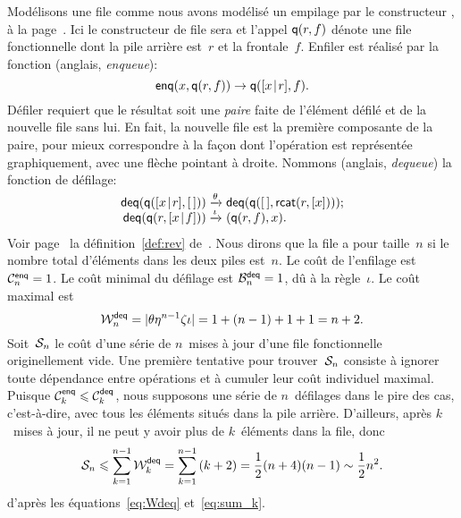 Modélisons une file comme nous avons modélisé un empilage par le
constructeur , à la
page~\pageref{par:stacks}. Ici le constructeur de file sera
 et l'appel \(\fun{q}(r,f)\) dénote une
file fonctionnelle dont la pile arrière est~\(r\) et la
frontale~\(f\). Enfiler est réalisé par la fonction
 (anglais, \emph{enqueue}):
\begin{equation}
\fun{enq}(x,\fun{q}(r,f)) \rightarrow \fun{q}(\cons{x}{r},f).
\label{def:enq}
\end{equation}
Défiler requiert que le résultat soit une \emph{paire} faite de l'élément défilé et de la nouvelle file
sans lui. En fait, la nouvelle file est la première composante de la
paire, pour mieux correspondre à la façon dont l'opération est
représentée graphiquement, avec une flèche pointant à droite.
Nommons  (anglais, \emph{dequeue})
la fonction de défilage:
\begin{equation}
\begin{array}{@{}r@{\;}l@{\;}l@{}}
  \fun{deq}(\fun{q}(\cons{x}{r},\el))
& \xrightarrow{\smash{\theta}}
& \fun{deq}(\fun{q}(\el,\fun{rcat}(r,[x])));\\
  \fun{deq}(\fun{q}(r,\cons{x}{f}))
& \xrightarrow{\smash{\iota}}
& \pair{\fun{q}(r,f)}{x}.
\end{array}
\label{def:deq}
\end{equation}
Voir page~\pageref{def:rev} la définition~\eqref{def:rev}
de~. Nous dirons que la file a
pour taille~\(n\) si le nombre total d'éléments dans les deux piles
est~\(n\).  Le coût de l'enfilage est
\(\C{\fun{enq}}{n} = 1\). Le coût
minimal du défilage est
\(\B{\fun{deq}}{n} = 1\), dû à la règle~\(\iota\). Le coût maximal est
\begin{equation}
  \W{\fun{deq}}{n} = \len{\theta\eta^{n-1}\zeta\iota} = 1 + (n-1)
+ 1 + 1 = n + 2. \label{eq:Wdeq}
\end{equation}
Soit~\(\A{n}\) le coût d'une série de \(n\)~mises à jour d'une file
fonctionnelle originellement vide. Une première tentative pour
trouver~\(\A{n}\) consiste à ignorer toute dépendance entre opérations
et à cumuler leur coût individuel maximal. Puisque \(\C{\fun{enq}}{k}
\leqslant \C{\fun{deq}}{k}\), nous supposons une série de
\(n\)~défilages dans le pire des cas, c'est-à-dire, avec tous les
éléments situés dans la pile arrière. D'ailleurs, après \(k\)~mises à
jour, il ne peut y avoir plus de \(k\)~éléments dans la file, donc
\begin{equation}
  \A{n} \leqslant \sum_{k=1}^{n-1}{\W{\fun{deq}}{k}} =
  \sum_{k=1}^{n-1}{(k+2)} =
  \frac{1}{2}(n+4)(n-1) \sim \frac{1}{2}{n^2}.
  \label{ineq:Sn_upper_bound}
\end{equation}
d'après les équations~\eqref{eq:Wdeq} et~\eqref{eq:sum_k}.


